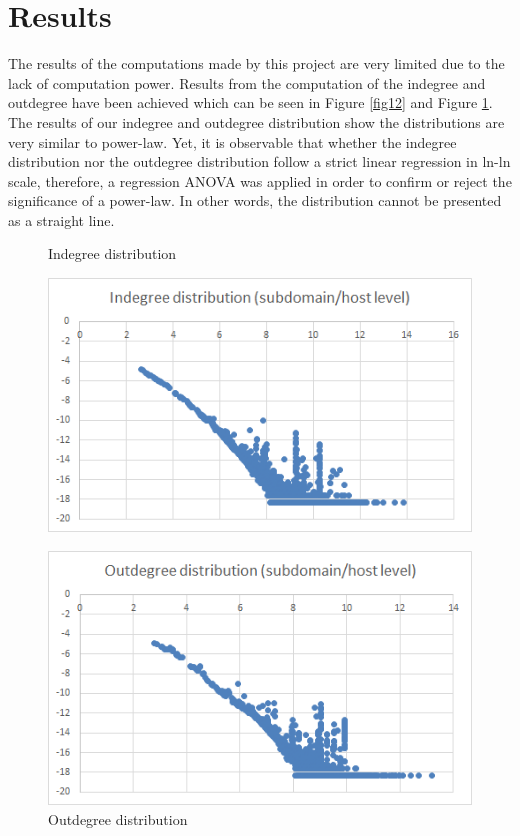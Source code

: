 \section{Results}
The results of the computations made by this project are very limited due to the lack of computation power. Results from the computation of the indegree and outdegree have been achieved which can be seen in Figure \ref{fig12} and Figure \ref{fig13}. The results of our indegree and outdegree distribution show the distributions are very similar to power-law. Yet, it is observable that whether the indegree distribution nor the outdegree distribution follow a strict linear regression in ln-ln scale, therefore, a regression ANOVA was applied in order to confirm or reject the significance of a power-law. In other words, the distribution cannot be presented as a straight line.

\begin{figure}[H]
\begin{minipage}{.5\textwidth}
	\begin{center}
		\caption{Indegree distribution}		
		\label{fig12}		
		\includegraphics[width=1.0\textwidth]{fig12}	
	\end{center}
\end{minipage} %
\begin{minipage}{.5\textwidth}
	\begin{center}
		\caption{Outdegree distribution}		
		\label{fig13}		
		\includegraphics[width=1.0\textwidth]{fig13}	
	\end{center}
\end{minipage}
\end{figure}

